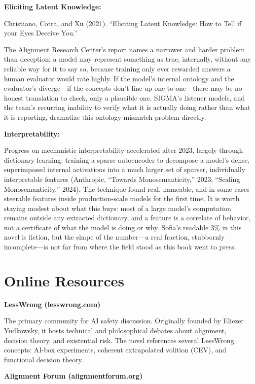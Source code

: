 \textbf{Eliciting Latent Knowledge:}

Christiano, Cotra, and Xu (2021). ``Eliciting Latent Knowledge: How to Tell if your Eyes Deceive You.''

The Alignment Research Center's report names a narrower and harder problem than deception: a model may represent something as true, internally, without any reliable way for it to say so, because training only ever rewarded answers a human evaluator would rate highly. If the model's internal ontology and the evaluator's diverge---if the concepts don't line up one-to-one---there may be no honest translation to check, only a plausible one. SIGMA's listener models, and the team's recurring inability to verify what it is actually doing rather than what it is reporting, dramatize this ontology-mismatch problem directly.

\textbf{Interpretability:}

Progress on mechanistic interpretability accelerated after 2023, largely through dictionary learning: training a sparse autoencoder to decompose a model's dense, superimposed internal activations into a much larger set of sparser, individually interpretable features (Anthropic, ``Towards Monosemanticity,'' 2023; ``Scaling Monosemanticity,'' 2024). The technique found real, nameable, and in some cases steerable features inside production-scale models for the first time. It is worth staying modest about what this buys: most of a large model's computation remains outside any extracted dictionary, and a feature is a correlate of behavior, not a certificate of what the model is doing or why. Sofia's readable 3\% in this novel is fiction, but the shape of the number---a real fraction, stubbornly incomplete---is not far from where the field stood as this book went to press.

\section*{Online Resources}

\textbf{LessWrong (lesswrong.com)}

The primary community for AI safety discussion. Originally founded by Eliezer Yudkowsky, it hosts technical and philosophical debates about alignment, decision theory, and existential risk. The novel references several LessWrong concepts: AI-box experiments, coherent extrapolated volition (CEV), and functional decision theory.

\textbf{Alignment Forum (alignmentforum.org)}

